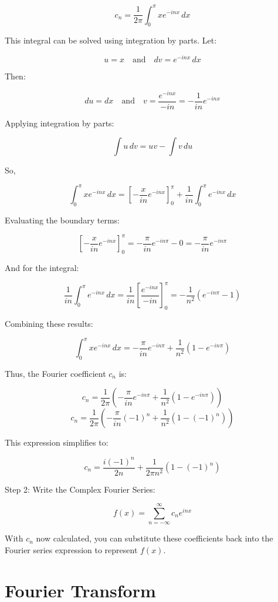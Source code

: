 \[ c_n = \frac{1}{2\pi} \int_{0}^{\pi} x e^{-inx} \, dx \]

This integral can be solved using integration by parts. Let:

\[ u = x \quad \text{and} \quad dv = e^{-inx} \, dx \]

Then:

\[ du = dx \quad \text{and} \quad v = \frac{e^{-inx}}{-in} = -\frac{1}{in} e^{-inx} \]

Applying integration by parts:

\[ \int u \, dv = uv - \int v \, du \]

So,

\[ \int_{0}^{\pi} x e^{-inx} \, dx = \left[ -\frac{x}{in} e^{-inx} \right]_{0}^{\pi} + \frac{1}{in} \int_{0}^{\pi} e^{-inx} \, dx \]

Evaluating the boundary terms:

\[ \left[ -\frac{x}{in} e^{-inx} \right]_{0}^{\pi} = -\frac{\pi}{in} e^{-in\pi} - 0 = -\frac{\pi}{in} e^{-in\pi} \]

And for the integral:

\[ \frac{1}{in} \int_{0}^{\pi} e^{-inx} \, dx = \frac{1}{in} \left[ \frac{e^{-inx}}{-in} \right]_{0}^{\pi} = -\frac{1}{n^2} \left( e^{-in\pi} - 1 \right) \]

Combining these results:

\[ \int_{0}^{\pi} x e^{-inx} \, dx = -\frac{\pi}{in} e^{-in\pi} + \frac{1}{n^2} (1 - e^{-in\pi}) \]

Thus, the Fourier coefficient \( c_n \) is:

\[ c_n = \frac{1}{2\pi} \left( -\frac{\pi}{in} e^{-in\pi} + \frac{1}{n^2} (1 - e^{-in\pi}) \right) \]
\[ c_n = \frac{1}{2\pi} \left( -\frac{\pi}{in} (-1)^n + \frac{1}{n^2} (1 - (-1)^n) \right) \]

This expression simplifies to:

\[ c_n = \frac{i(-1)^n}{2n} + \frac{1}{2\pi n^2} (1 - (-1)^n) \]

Step 2: Write the Complex Fourier Series:

\[ f(x) = \sum_{n=-\infty}^{\infty} c_n e^{inx} \]

With \( c_n \) now calculated, you can substitute these coefficients back into the Fourier series expression to represent \( f(x) \).

\section{Fourier Transform}
\label{sec:fourier_transform}

